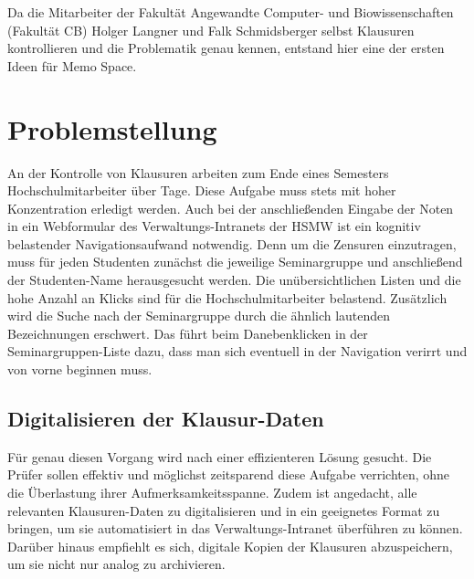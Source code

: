 \documentclass[notables, nomenclature, oneside, 150]{HSMW-Thesis}
\begin{document}
	Da die Mitarbeiter der Fakultät Angewandte Computer- und Biowissenschaften (Fakultät CB) Holger Langner und Falk Schmidsberger selbst Klausuren kontrollieren und die Problematik genau kennen, entstand hier eine der ersten Ideen für Memo Space.


\chapter{Problemstellung}\label{ch:problemstellung}
	An der Kontrolle von Klausuren arbeiten zum Ende eines Semesters Hochschulmitarbeiter über Tage. Diese Aufgabe muss stets mit hoher Konzentration erledigt werden. Auch bei der anschließenden Eingabe der Noten in ein Webformular des Verwaltungs-Intranets der HSMW ist ein kognitiv belastender Navigationsaufwand notwendig. Denn um die Zensuren einzutragen, muss für jeden Studenten zunächst die jeweilige Seminargruppe und anschließend der Studenten-Name herausgesucht werden. Die unübersichtlichen Listen und die hohe Anzahl an Klicks sind für die Hochschulmitarbeiter belastend. Zusätzlich wird die Suche nach der Seminargruppe durch die ähnlich lautenden Bezeichnungen erschwert. Das führt beim Danebenklicken in der Seminargruppen-Liste dazu, dass man sich eventuell in der Navigation verirrt und von vorne beginnen muss.
	
	\section{Digitalisieren der Klausur-Daten}
	Für genau diesen Vorgang wird nach einer effizienteren Lösung gesucht. Die Prüfer sollen effektiv und möglichst zeitsparend diese Aufgabe verrichten, ohne die Überlastung ihrer Aufmerksamkeitsspanne. Zudem ist angedacht, alle relevanten Klausuren-Daten zu digitalisieren und in ein geeignetes Format zu bringen, um sie automatisiert in das Verwaltungs-Intranet überführen zu können. Darüber hinaus empfiehlt es sich, digitale Kopien der Klausuren abzuspeichern, um sie nicht nur analog zu archivieren.
	
\end{document}
